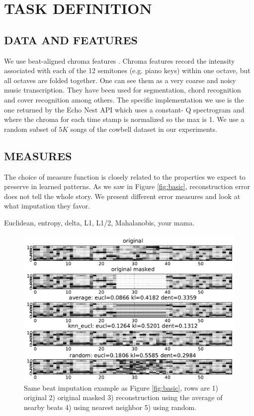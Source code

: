 \documentclass{article}
\begin{document}
\section{TASK DEFINITION}
\label{sec:task}

\subsection{DATA AND FEATURES}
\label{ssec:feats}
We use beat-aligned chroma features \cite{Ellis2007a}. Chroma features
record the intensity associated with each of the 12 semitones
(e.g. piano keys) within one octave, but all octaves
are folded together. One can see them as a very coarse and
noisy music transcription. They have been used for segmentation, 
chord recognition and cover recognition
among others. The specific implementation we use is the one
returned by the Echo Nest API \cite{EchoNest} which uses a constant-
Q spectrogram and where the chroma for each time stamp is
normalized so the max is 1. We use a random subset of $5K$ songs of
the cowbell dataset \cite{Bertin-Mahieux2010a} in our experiments.

\subsection{MEASURES}
\label{ssec:measures}
The choice of measure function is closely related to the properties
we expect to preserve in learned patterns. As we saw in Figure
\ref{fig:basic}, reconstruction error does not tell the whole story.
We present different error measures and look at what imputation they
favor.

Euclidean, entropy, delta, L1, L1/2, Mahalanobis, your mama.

\begin{figure}[t]
\begin{center}
\includegraphics[width=.95\columnwidth]{avg_nn_rand}
\end{center}
\caption{Same beat imputation example as Figure \ref{fig:basic}, 
rows are 1) original 2) original masked
3) reconstruction using the average of nearby beats 4) using
nearest neighbor 5) using random.
\label{fig:avgnnrand}}
\end{figure}
\end{document}
